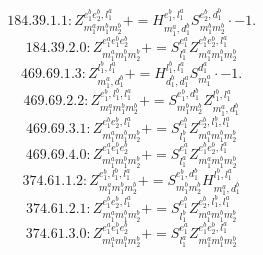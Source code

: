 \documentclass[letterpaper,10pt,fleqn,leqno,onecolumn]{article}
\begin{document}
\begin{equation} \;\;\;\;\;\;  184.39.1.1: Z^{e_{1}^{b}e_{2}^{b},l_{1}^{a}}_{m_{1}^{a}m_{1}^{b}m_{2}^{b}}+=H^{e_{1}^{b},l_{1}^{a}}_{m_{1}^{a},d_{1}^{b}}S^{e_{2}^{b},d_{1}^{b}}_{m_{1}^{b}m_{2}^{b}}\cdot -1. \end{equation}
\begin{equation} \;\;\;\;\;\;  184.39.2.0: Z^{e_{1}^{a}e_{1}^{b}e_{2}^{b}}_{m_{1}^{a}m_{1}^{b}m_{2}^{b}}+=S^{e_{1}^{a}}_{l_{1}^{a}}Z^{e_{1}^{b}e_{2}^{b},l_{1}^{a}}_{m_{1}^{a}m_{1}^{b}m_{2}^{b}} \end{equation}
\begin{equation} \;\;\;\;\;\;  469.69.1.3: Z^{l_{1}^{b},l_{1}^{a}}_{m_{1}^{a},d_{1}^{b}}+=H^{l_{1}^{b},l_{1}^{a}}_{d_{1}^{b},d_{1}^{a}}S^{d_{1}^{a}}_{m_{1}^{a}}\cdot -1. \end{equation}
\begin{equation} \;\;\;\;\;\;  469.69.2.2: Z^{e_{1}^{b},l_{1}^{b},l_{1}^{a}}_{m_{1}^{a}m_{1}^{b}m_{2}^{b}}+=S^{e_{1}^{b},d_{1}^{b}}_{m_{1}^{b}m_{2}^{b}}Z^{l_{1}^{b},l_{1}^{a}}_{m_{1}^{a},d_{1}^{b}} \end{equation}
\begin{equation} \;\;\;\;\;\;  469.69.3.1: Z^{e_{1}^{b}e_{2}^{b},l_{1}^{a}}_{m_{1}^{a}m_{1}^{b}m_{2}^{b}}+=S^{e_{1}^{b}}_{l_{1}^{b}}Z^{e_{2}^{b},l_{1}^{b},l_{1}^{a}}_{m_{1}^{a}m_{1}^{b}m_{2}^{b}} \end{equation}
\begin{equation} \;\;\;\;\;\;  469.69.4.0: Z^{e_{1}^{a}e_{1}^{b}e_{2}^{b}}_{m_{1}^{a}m_{1}^{b}m_{2}^{b}}+=S^{e_{1}^{a}}_{l_{1}^{a}}Z^{e_{1}^{b}e_{2}^{b},l_{1}^{a}}_{m_{1}^{a}m_{1}^{b}m_{2}^{b}} \end{equation}
\begin{equation} \;\;\;\;\;\;  374.61.1.2: Z^{e_{1}^{b},l_{1}^{b},l_{1}^{a}}_{m_{1}^{a}m_{1}^{b}m_{2}^{b}}+=S^{e_{1}^{b},d_{1}^{b}}_{m_{1}^{b}m_{2}^{b}}H^{l_{1}^{b},l_{1}^{a}}_{m_{1}^{a},d_{1}^{b}} \end{equation}
\begin{equation} \;\;\;\;\;\;  374.61.2.1: Z^{e_{1}^{b}e_{2}^{b},l_{1}^{a}}_{m_{1}^{a}m_{1}^{b}m_{2}^{b}}+=S^{e_{1}^{b}}_{l_{1}^{b}}Z^{e_{2}^{b},l_{1}^{b},l_{1}^{a}}_{m_{1}^{a}m_{1}^{b}m_{2}^{b}} \end{equation}
\begin{equation} \;\;\;\;\;\;  374.61.3.0: Z^{e_{1}^{a}e_{1}^{b}e_{2}^{b}}_{m_{1}^{a}m_{1}^{b}m_{2}^{b}}+=S^{e_{1}^{a}}_{l_{1}^{a}}Z^{e_{1}^{b}e_{2}^{b},l_{1}^{a}}_{m_{1}^{a}m_{1}^{b}m_{2}^{b}} \end{equation}
\end{document}
